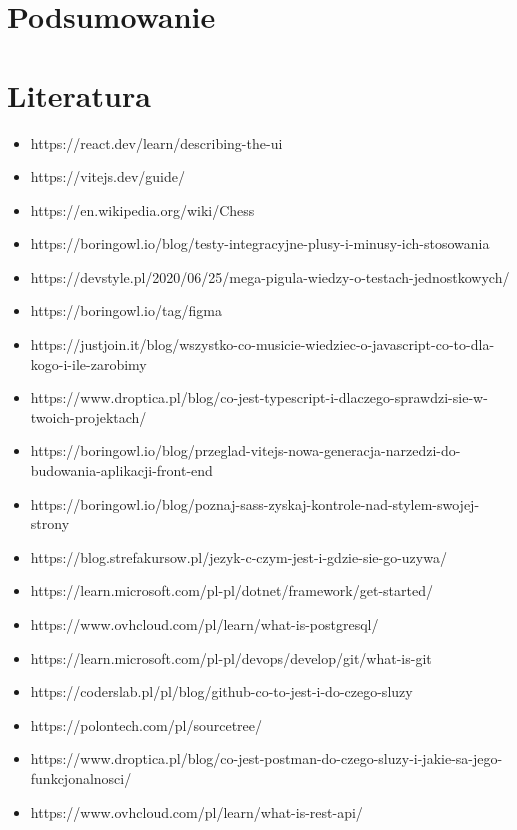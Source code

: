 \documentclass[12pt,a4paper]{article}
\begin{document}
\newpage
\section{Podsumowanie}

\newpage
\section{Literatura}

\begin{itemize}
    \item https://react.dev/learn/describing-the-ui
    \item https://vitejs.dev/guide/
    \item https://en.wikipedia.org/wiki/Chess
    \item https://boringowl.io/blog/testy-integracyjne-plusy-i-minusy-ich-stosowania
    \item https://devstyle.pl/2020/06/25/mega-pigula-wiedzy-o-testach-jednostkowych/
    \item https://boringowl.io/tag/figma
    \item https://justjoin.it/blog/wszystko-co-musicie-wiedziec-o-javascript-co-to-dla-kogo-i-ile-zarobimy
    \item https://www.droptica.pl/blog/co-jest-typescript-i-dlaczego-sprawdzi-sie-w-twoich-projektach/
    \item https://boringowl.io/blog/przeglad-vitejs-nowa-generacja-narzedzi-do-budowania-aplikacji-front-end
    \item https://boringowl.io/blog/poznaj-sass-zyskaj-kontrole-nad-stylem-swojej-strony
    \item https://blog.strefakursow.pl/jezyk-c-czym-jest-i-gdzie-sie-go-uzywa/
    \item https://learn.microsoft.com/pl-pl/dotnet/framework/get-started/
    \item https://www.ovhcloud.com/pl/learn/what-is-postgresql/
    \item https://learn.microsoft.com/pl-pl/devops/develop/git/what-is-git
    \item https://coderslab.pl/pl/blog/github-co-to-jest-i-do-czego-sluzy
    \item https://polontech.com/pl/sourcetree/
    \item https://www.droptica.pl/blog/co-jest-postman-do-czego-sluzy-i-jakie-sa-jego-funkcjonalnosci/
    \item https://www.ovhcloud.com/pl/learn/what-is-rest-api/
\end{itemize}
\end{document}
